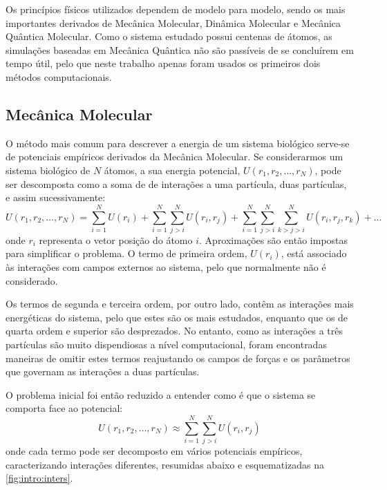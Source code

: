 \documentclass[12pt,a4paper]{article}
\begin{document}
	Os princípios físicos utilizados dependem de modelo para modelo, sendo os mais importantes derivados de Mecânica Molecular, Dinâmica Molecular e Mecânica Quântica Molecular. Como o sistema estudado possui centenas de átomos, as simulações baseadas em Mecânica Quântica não são passíveis de se concluírem em tempo útil, pelo que neste trabalho apenas foram usados os primeiros dois métodos computacionais.
	
\subsection{Mecânica Molecular}\label{sec:MM}
	O método mais comum para descrever a energia de um sistema biológico serve-se de potenciais empíricos derivados da Mecânica Molecular.	Se considerarmos um sistema biológico de $N$ átomos, a sua energia potencial, $U\left(r_{1}, r_{2}, \ldots, r_{N}\right)$, pode ser descomposta como a soma de de interações a uma partícula, duas partículas, e assim sucessivamente:
	\begin{equation}
		U\left(r_{1}, r_{2}, \ldots, r_{N}\right) = \sum_{i=1}^{N} U\left(r_{i}\right)+\sum_{i=1}^{N} \sum_{j>i}^{N} U\left(r_{i}, r_{j}\right)+\sum_{i=1}^{N} \sum_{j>i}^{N} \sum_{k>j>i}^{N} U\left(r_{i}, r_{j}, r_{k}\right)+\ldots
		\label{eq:intro:Udecomp}
	\end{equation}
	onde $r_i$ representa o vetor posição do átomo $i$. Aproximações são então impostas para simplificar o problema. O termo de primeira ordem, $U\left(r_{i}\right)$, está associado às interações com campos externos ao sistema, pelo que normalmente não é considerado.
	
	Os termos de segunda e terceira ordem, por outro lado, contêm as interações mais energéticas do sistema, pelo que estes são os mais estudados, enquanto que os de quarta ordem e superior são desprezados. No entanto, como as interações a três partículas são muito dispendiosas a nível computacional, foram encontradas maneiras de omitir estes termos reajustando os campos de forças e os parâmetros que governam as interações a duas partículas.
	
	O problema inicial foi então reduzido a entender como é que o sistema se comporta face ao potencial:
	\begin{equation}
		U\left(r_{1}, r_{2}, \ldots, r_{N}\right) \approx \sum_{i=1}^{N} \sum_{j>i}^{N} U\left(r_{i}, r_{j}\right)
		\label{eq:intro:Usecond-order}
	\end{equation}
	onde cada termo pode ser decomposto em vários potenciais empíricos, caracterizando interações diferentes, resumidas abaixo e esquematizadas na \cref{fig:intro:inters}.
\end{document}
